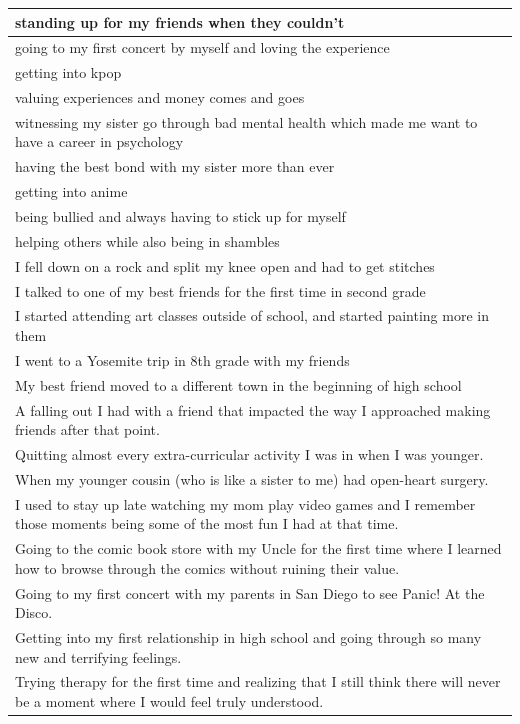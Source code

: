 \documentclass[
  .7em,
  letterpaper,
  DIV=11,
  numbers=noendperiod]{scrartcl}
\begin{document}
\begin{table}
\begin{tabular}{l}
\hline
standing up for my friends when they couldn't\\
\hline
going to my first concert by myself and loving the experience\\
\hline
getting into kpop\\
\hline
valuing experiences and money comes and goes\\
\hline
witnessing my sister go through bad mental health which made me want to have a career in psychology\\
\hline
having the best bond with my sister more than ever\\
\hline
getting into anime\\
\hline
being bullied and always having to stick up for myself\\
\hline
helping others while also being in shambles\\
\hline
I fell down on a rock and split my knee open and had to get stitches\\
\hline
I talked to one of my best friends for the first time in second grade\\
\hline
I started attending art classes outside of school, and started painting more in them\\
\hline
I went to a Yosemite trip in 8th grade with my friends\\
\hline
My best friend moved to a different town in the beginning of high school\\
\hline
A falling out I had with a friend that impacted the way I approached making friends after that point.\\
\hline
Quitting almost every extra-curricular activity I was in when I was younger.\\
\hline
When my younger cousin (who is like a sister to me) had open-heart surgery.\\
\hline
I used to stay up late watching my mom play video games and I remember those moments being some of the most fun I had at that time.\\
\hline
Going to the comic book store with my Uncle for the first time where I learned how to browse through the comics without ruining their value.\\
\hline
Going to my first concert with my parents in San Diego to see Panic! At the Disco.\\
\hline
Getting into my first relationship in high school and going through so many new and terrifying feelings.\\
\hline
Trying therapy for the first time and realizing that I still think there will never be a moment where I would feel truly understood.\\

\end{tabular}
\end{table}
\end{document}
